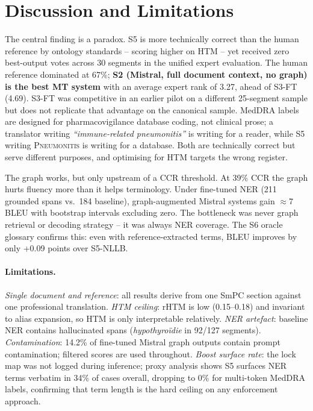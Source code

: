 \documentclass[11pt,a4paper,twocolumn]{article}
\begin{document}
\section{Discussion and Limitations}
\label{sec:discussion}

The central finding is a paradox. S5 is more technically correct than the
human reference by ontology standards -- scoring higher on HTM -- yet
received zero best-output votes across 30 segments in the unified expert
evaluation. The human reference dominated at 67\%; \textbf{S2 (Mistral,
full document context, no graph) is the best MT system} with an average
expert rank of 3.27, ahead of S3-FT (4.69). S3-FT was competitive in
an earlier pilot on a different 25-segment sample but does not replicate
that advantage on the canonical sample. MedDRA labels are designed for
pharmacovigilance database coding, not clinical prose; a translator
writing \textit{``immune-related pneumonitis''} is writing for a reader,
while S5 writing \textsc{Pneumonitis} is writing for a database. Both
are technically correct but serve different purposes, and optimising for
HTM targets the wrong register.

The graph works, but only upstream of a CCR threshold. At 39\% CCR the
graph hurts fluency more than it helps terminology. Under fine-tuned NER
(211 grounded spans vs.\ 184 baseline), graph-augmented Mistral systems
gain $\approx$7 BLEU with bootstrap intervals excluding zero. The bottleneck
was never graph retrieval or decoding strategy -- it was always NER coverage.
The S6 oracle glossary confirms this: even with reference-extracted terms,
BLEU improves by only +0.09 points over S5-NLLB.

\paragraph{Limitations.}
\textit{Single document and reference}: all results derive from one SmPC
section against one professional translation.
\textit{HTM ceiling}: rHTM is low (0.15--0.18) and invariant to alias
expansion, so HTM is only interpretable relatively.
\textit{NER artefact}: baseline NER contains hallucinated spans
(\textit{hypothyro\"{i}die} in 92/127 segments).
\textit{Contamination}: 14.2\% of fine-tuned Mistral graph outputs contain
prompt contamination; filtered scores are used throughout.
\textit{Boost surface rate}: the lock map was not logged during inference;
proxy analysis shows S5 surfaces NER terms verbatim in 34\% of cases
overall, dropping to 0\% for multi-token MedDRA labels, confirming that
term length is the hard ceiling on any enforcement approach.
\end{document}
